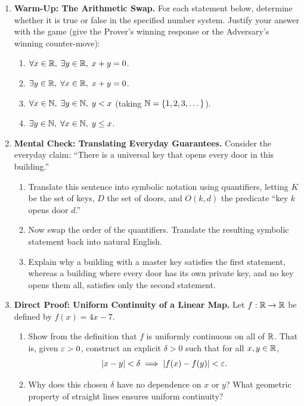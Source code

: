 \begin{enumerate}
  \item \textbf{Warm-Up: The Arithmetic Swap.}
  For each statement below, determine whether it is true or false in the specified number system. Justify your answer with the game (give the Prover's winning response or the Adversary's winning counter-move):
  \begin{enumerate}
    \item $\forall x \in \mathbb{R}, \; \exists y \in \mathbb{R}, \; x + y = 0$.
    \item $\exists y \in \mathbb{R}, \; \forall x \in \mathbb{R}, \; x + y = 0$.
    \item $\forall x \in \mathbb{N}, \; \exists y \in \mathbb{N}, \; y < x$ \quad (taking $\mathbb{N} = \{1, 2, 3, \dots\}$).
    \item $\exists y \in \mathbb{N}, \; \forall x \in \mathbb{N}, \; y \le x$.
  \end{enumerate}

  \item \textbf{Mental Check: Translating Everyday Guarantees.}
  Consider the everyday claim: ``There is a universal key that opens every door in this building.''
  \begin{enumerate}
    \item Translate this sentence into symbolic notation using quantifiers, letting $K$ be the set of keys, $D$ the set of doors, and $O(k, d)$ the predicate ``key $k$ opens door $d$.''
    \item Now swap the order of the quantifiers. Translate the resulting symbolic statement back into natural English.
    \item Explain why a building with a master key satisfies the first statement, whereas a building where every door has its own private key, and no key opens them all, satisfies only the second statement.
  \end{enumerate}

  \item \textbf{Direct Proof: Uniform Continuity of a Linear Map.}
  Let $f: \mathbb{R} \to \mathbb{R}$ be defined by $f(x) = 4x - 7$.
  \begin{enumerate}
    \item Show from the definition that $f$ is uniformly continuous on all of $\mathbb{R}$. That is, given $\varepsilon > 0$, construct an explicit $\delta > 0$ such that for all $x, y \in \mathbb{R}$,
    \[
    |x - y| < \delta \implies |f(x) - f(y)| < \varepsilon.
    \]
    \item Why does this chosen $\delta$ have no dependence on $x$ or $y$? What geometric property of straight lines ensures uniform continuity?
  \end{enumerate}


\end{enumerate}
